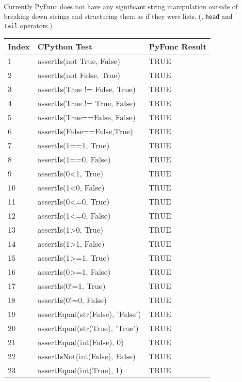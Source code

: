 \documentclass{l4proj}
\begin{document}
    Currently PyFunc does not have any significant string manipulation outside of breaking down strings and structuring them as if they were lists. (\text{::}, \texttt{head} and \texttt{tail} operators.)


\begin{table}[!ht]
    \centering
    \begin{tabular}{|l|l|l|}
    \hline
        Index & CPython Test  & PyFunc Result \\ \hline
        1 & assertIs(not True, False)  & TRUE \\ \hline
        2 & assertIs(not False, True)  & TRUE \\ \hline
        3 & assertIs(True != False, True)  & TRUE \\ \hline
        4 & assertIs(True != True, False)  & TRUE \\ \hline
        5 & assertIs(True==False, False)  & TRUE \\ \hline
        6 & assertIs(False==False,True)  & TRUE \\ \hline
        7 & assertIs(1==1, True)  & TRUE \\ \hline
        8 & assertIs(1==0, False)  & TRUE \\ \hline
        9 & assertIs(0<1, True)  & TRUE \\ \hline
        10 & assertIs(1<0, False)  & TRUE \\ \hline
        11 & assertIs(0<=0, True) & TRUE \\ \hline
        12 & assertIs(1<=0, False)  & TRUE \\ \hline
        13 & assertIs(1>0, True) & TRUE \\ \hline
        14 & assertIs(1>1, False)  & TRUE \\ \hline
        15 & assertIs(1>=1, True)  & TRUE \\ \hline
        16 & assertIs(0>=1, False)  & TRUE \\ \hline
        17 & assertIs(0!=1, True) & TRUE \\ \hline
        18 & assertIs(0!=0, False) & TRUE \\ \hline
        19 & assertEqual(str(False), 'False')  & TRUE \\ \hline
        20 & assertEqual(str(True), 'True')  & TRUE \\ \hline
        21 & assertEqual(int(False), 0)  & TRUE \\ \hline
        22 & assertIsNot(int(False), False)  & TRUE \\ \hline
        23 & assertEqual(int(True), 1)  & TRUE \\ \hline

\end{tabular}
\end{table}
\end{document}
